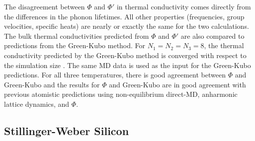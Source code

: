 \documentclass[letterpaper,12pt]{article}
\begin{document}
The disagreement between $\Phi$ and $\Phi'$ in thermal conductivity comes directly from the differences in the phonon lifetimes. All other properties (frequencies, group velocities, specific heats) are nearly or exactly the same for the two calculations. The bulk thermal conductivities predicted from $\Phi$ and $\Phi'$ are also compared to predictions from the Green-Kubo method. For $N_1=N_2=N_3=8$, the thermal conductivity predicted by the Green-Kubo method is converged with respect to the simulation size \cite{mcgaughey2004c}. The same MD data is used as the input for the Green-Kubo predictions. For all three temperatures, there is good agreement between $\Phi$ and Green-Kubo and the results for $\Phi$ and Green-Kubo are in good agreement with previous atomistic predictions\cite{turney2009a} using non-equilibrium direct-MD, anharmonic lattice dynamics, and $\Phi$.

%
%
%
%
%
%

\subsection{\label{S:Subsection_prop_SW}Stillinger-Weber Silicon}
\end{document}
